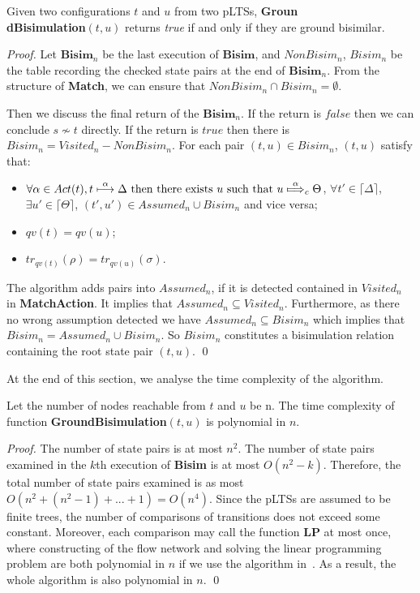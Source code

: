 \documentclass[runningheads]{llncs}
\begin{document}
\begin{theorem}[Correctness]\label{thm:correctness}
Given two configurations $t$ and $u$ from two pLTSs, \textbf{Groun}\\\text{-}\textbf{dBisimulation}$(t,u)$ returns \textit{true} if and only if they are ground bisimilar.
\end{theorem} 
\begin{proof}
Let $\textbf{Bisim}_{n}$ be the last execution of $\textbf{Bisim}$, and $NonBisim_{n}$, $Bisim_{n}$ be the table recording the checked state pairs at the end of $\textbf{Bisim}_{n}$. From the structure of \textbf{Match}, we can ensure that $NonBisim_{n}\cap Bisim_{n}=\emptyset$.

Then we discuss the final return of the $\textbf{Bisim}_{n}$. If the return is $false$ then we can conclude $s\not\sim t$ directly. If the return is $true$ then there is $Bisim_{n} = Visited_{n} - NonBisim_{n}$. For each pair $(t, u)\in Bisim_{n}$, $(t,u)$ satisfy that:
\begin{itemize}
    \item $\forall\alpha\in Act(t), t\overset{\alpha}{\longmapsto}\Delta\text{ then there exists } u \text{ such that } u\overset{\alpha}{\mapstochar\Longrightarrow}_{c}\Theta$, $\forall t'\in\lceil\Delta\rceil$, $\exists u'\in\lceil\Theta\rceil$, $(t', u')\in Assumed_{n}\cup Bisim_{n}$ and vice versa;
    \item $qv(t)=qv(u)$;
    \item $tr_{qv(t)}(\rho)=tr_{qv(u)}(\sigma)$.
\end{itemize}
The algorithm adds pairs into $Assumed_{n}$, if it is detected contained in $Visited_{n}$ in \textbf{MatchAction}. It implies that $Assumed_{n}\subseteq Visited_{n}$. Furthermore, as there no wrong assumption detected we have $Assumed_{n}\subseteq Bisim_{n}$ which implies that $Bisim_{n}=Assumed_{n}\cup Bisim_{n}$. So $Bisim_{n}$ constitutes a bisimulation relation containing the root state pair $(t, u)$.
\qed
\end{proof}

At the end of this section, we analyse the time complexity of the algorithm.

\begin{theorem}[Complexity]\label{thm:complexity}
Let the number of nodes reachable from $t$ and $u$ be n. The time complexity of function \textbf{GroundBisimulation}$(t,u)$ is polynomial in $n$. %
\end{theorem}
\begin{proof}
The number of state pairs is at most $n^2$. The number of state pairs examined in the $k$th execution of \textbf{Bisim} is at most $O(n^2-k)$. Therefore, the total number of state pairs examined is as most $O(n^2+(n^2-1)+...+1)=O(n^4)$. Since the pLTSs are assumed to be finite trees, the number of comparisons of transitions does not exceed some constant. Moreover, each comparison may call the function \textbf{LP} at most once, where constructing of the flow network and solving the linear programming problem are both polynomial in $n$ if we use the algorithm in~\cite{TH15}. As a result, the whole algorithm is also polynomial in $n$.
\qed
\end{proof}
\end{document}
